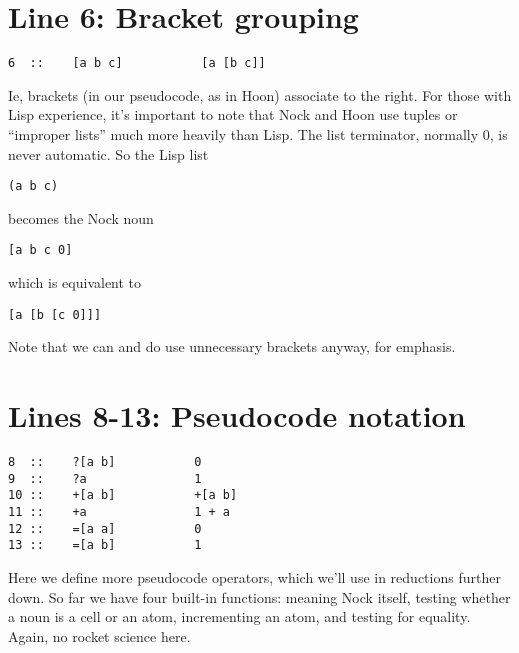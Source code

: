 \section{Line 6: Bracket grouping}

\begin{framed_shaded}
\begin{Verbatim}[fontsize=\relsize{-2.5},commandchars=\\\{\}]
6  ::    [a b c]           [a [b c]]
\end{Verbatim}
\end{framed_shaded}
Ie, brackets (in our pseudocode, as in Hoon) associate to the right.  For those
with Lisp experience, it's important to note that Nock and Hoon use tuples or
``improper lists'' much more heavily than Lisp.  The list terminator, normally 0,
is never automatic.  So the Lisp list 

\begin{framed_shaded}
\begin{Verbatim}[fontsize=\relsize{-2.5},commandchars=\\\{\}]
(a b c)
\end{Verbatim}
\end{framed_shaded}
becomes the Nock noun

\begin{framed_shaded}
\begin{Verbatim}[fontsize=\relsize{-2.5},commandchars=\\\{\}]
[a b c 0]
\end{Verbatim}
\end{framed_shaded}
which is equivalent to

\begin{framed_shaded}
\begin{Verbatim}[fontsize=\relsize{-2.5},commandchars=\\\{\}]
[a [b [c 0]]]
\end{Verbatim}
\end{framed_shaded}
Note that we can and do use unnecessary brackets anyway, for
emphasis.

\section{Lines 8-13: Pseudocode notation}

\begin{framed_shaded}
\begin{Verbatim}[fontsize=\relsize{-2.5},commandchars=\\\{\}]
8  ::    ?[a b]           0
9  ::    ?a               1
10 ::    +[a b]           +[a b]
11 ::    +a               1 + a
12 ::    =[a a]           0
13 ::    =[a b]           1
\end{Verbatim}
\end{framed_shaded}
Here we define more pseudocode operators, which we'll use in reductions further
down.  So far we have four built-in functions: \kode{*} meaning Nock itself, 
testing whether a noun is a cell or an atom, \kode{+} incrementing an atom, and \kode{=}
testing for equality.  Again, no rocket science here.


